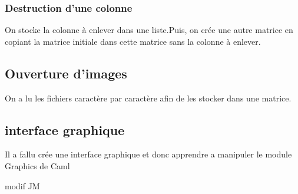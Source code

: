 \documentclass{article}
\begin{document}
\subsubsection{Destruction d'une colonne}

On stocke la colonne à enlever dans une liste.Puis, on crée une autre matrice en copiant la matrice initiale dans cette matrice sans la colonne à enlever.
 
\subsection{Ouverture d'images}

On a lu les fichiers caractère par caractère afin de les stocker dans une matrice. 


\subsection{interface graphique}
Il a fallu crée une interface graphique et donc apprendre a manipuler le module Graphics de Caml

modif
JM
\end{document}
